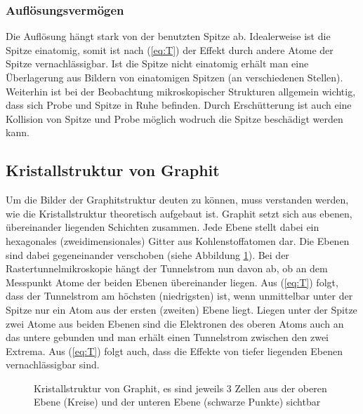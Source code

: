 \subsubsection{Auflösungsvermögen}
Die Auflösung hängt stark von der benutzten Spitze ab. Idealerweise ist die Spitze einatomig, somit ist nach (\ref{eq:T}) der Effekt durch andere Atome der Spitze vernachlässigbar. Ist die Spitze nicht einatomig erhält man eine Überlagerung aus Bildern von einatomigen Spitzen (an verschiedenen Stellen). Weiterhin ist bei der Beobachtung mikroskopischer Strukturen allgemein wichtig, dass sich Probe und Spitze in Ruhe befinden. Durch Erschütterung ist auch eine Kollision von Spitze und Probe möglich wodruch die Spitze beschädigt werden kann.

\subsection{Kristallstruktur von Graphit}
Um die Bilder der Graphitstruktur deuten zu können, muss verstanden werden, wie die Kristallstruktur theoretisch aufgebaut ist. Graphit setzt sich aus ebenen, übereinander liegenden Schichten zusammen. Jede Ebene stellt dabei ein hexagonales (zweidimensionales) Gitter aus Kohlenstoffatomen dar. Die Ebenen sind dabei gegeneinander verschoben (siehe Abbildung \ref{fig:Graphit}). Bei der Rastertunnelmikroskopie hängt der Tunnelstrom nun davon ab, ob an dem Messpunkt Atome der beiden Ebenen übereinander liegen. Aus (\ref{eq:T}) folgt, dass der Tunnelstrom am höchsten (niedrigsten) ist, wenn unmittelbar unter der Spitze nur ein Atom aus der ersten (zweiten) Ebene liegt. Liegen unter der Spitze zwei Atome aus beiden Ebenen sind die Elektronen des oberen Atoms auch an das untere gebunden und man erhält einen Tunnelstrom zwischen den zwei Extrema. Aus (\ref{eq:T}) folgt auch, dass die Effekte von tiefer liegenden Ebenen vernachlässigbar sind.  

\begin{figure}[h]
  \centering
  \caption{Kristallstruktur von Graphit, es sind jeweils 3 Zellen aus der oberen Ebene (Kreise) und der unteren Ebene (schwarze Punkte) sichtbar}
  \label{fig:Graphit}
\end{figure}

             

